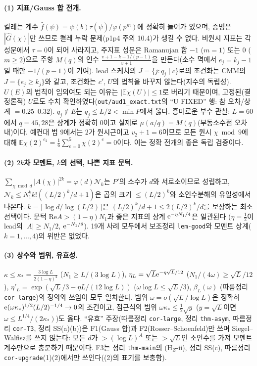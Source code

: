\paragraph{(1) 지표/Gauss 합 전개.}
켤레는 계수 $\hat f(\psi)=\psi(b)\tau(\overline\psi)/\varphi(p^m)$에 정확히 들어가 있으며, 증명은 $|\hat G(\chi)|$만 쓰므로 켤레 누락 문제(p1p4 주의 10.4)가 생길 수 없다.
비원시 지표는 각 성분에서 $\tau=0$이 되어 사라지고, 주지표 성분은 Ramanujan 합 $-1$ ($m=1$) 또는 $0$ ($m\ge2$)으로 주항 $M(q)$의 인수
$\frac{v+1-k-1/(p-1)}{v+1}$을 만든다(소수 멱에서 $e_j=k_j-1$일 때만 $-1/(p-1)$이 기여). lead 스케치의 $J=\{j:q_j\mid c\}$로의 조건화는
CMM의 $J=\{e_j\ge k_j\}$와 같고, 조건화는 $c'$, $U$의 법칙을 바꾸지 않는다(지수의 독립성). $U(E)$의 법칙이 임의여도 되는 이유는 $|\mathbb E\chi(U)|\le1$로 버리기 때문이며,
고정된(결정론적) $U$로도 수치 확인하였다(\texttt{out/aud1\_exact.txt}의 ``U FIXED'' 행: 참 오차/상계 $=0.25$--$0.32$). $q_j\notin E$는 $q_j\le L/2<\min P$에서 옳다.
흥미로운 부수 관찰: $L=60$에서 $q=45,28$은 상계가 정확히 $0$이고 실제로 $\mu(a/q)=M(q)$(부동소수점 오차 내)이다. 예컨대 법 $9$에서는 $2$가 원시근이고 $v_2+1=6$이므로
모든 원시 $\chi\bmod9$에 대해 $\mathbb E\chi(2)^{e_2}=\frac16\sum_{e=0}^5\chi(2)^e=0$이다. 이는 정확 전개의 좋은 독립 검증이다.

\paragraph{(2) $2k$차 모멘트, $k$의 선택, 나쁜 지표 문턱.}
$\sum_{\chi\bmod d}|A(\chi)|^{2k}=\varphi(d)\mathcal N_k$는 $P'$의 소수가 $d$와 서로소이므로 성립하고, $\mathcal N_k\le N_1^kk!((L/2)^k/d+1)$은 곱의 크기 $\le(L/2)^k$와 소인수분해의 유일성에서 나온다.
$k=\lceil\log d/\log(L/2)\rceil$은 $(L/2)^k/d+1\le2(L/2)^k/d$를 보장하는 최소 선택이다. 문턱 $\mathrm{Re}A>(1-\eta)N_1$과 좋은 지표의 상계 $\mathrm{e}^{-\eta N_1/4}$은 일관된다
($\eta=\frac12$이 lead의 $|A|\ge N_1/2$, $\mathrm{e}^{-N_1/8}$). 19개 사례 모두에서 보조정리 \texttt{lem-good}와 모멘트 상계($k=1,\dots,4$)의 위반은 없었다.

\paragraph{(3) 상수와 범위, 유효성.}
$\kappa\le\kappa_*=\frac{3\log L}{2(1-\eta)^2}$ ($N_1\ge L/(3\log L)$), $\eta_L=\sqrt L\mathrm{e}^{-\eta\sqrt L/12}$ ($N_1/(4\omega)\ge\sqrt L/12$), $\eta'_L=\exp(\sqrt L/3-\eta L/(12\log L))$
($\omega\log L\le\sqrt L/3$), $\beta_L(\omega)$ (따름정리 \texttt{cor-large})의 정의와 쓰임이 모두 일치한다. 범위 $\omega=o(\sqrt L/\log L)$은 정확히 $\mathrm{e}(\omega\kappa_*)^{1/2}(L/2)^{-1/4}\to0$의 조건이고,
점근식의 범위 $\omega\kappa_*\le\frac12\sqrt y$ ($y=\sqrt L$이면 $\omega\le L^{1/4}/(2\kappa_*)$)도 옳다. ``유효'' 주장(따름정리 \texttt{cor-large}, 정리 \texttt{thm-asym}, 따름정리 \texttt{cor-T3}, 정리 SS(a)(b))은
F1(Gauss 합)과 F2(Rosser--Schoenfeld)만 쓰며 Siegel--Walfisz를 쓰지 않는다: 모든 $d$가 $>(\log L)^A$ 또는 $>\sqrt L$인 소인수를 가져 모멘트 계수만으로 충분하기 때문이다.
F3는 정리 \texttt{thm-main}의 (H$_Z$-ii), 정리 SS(c), 따름정리 \texttt{cor-upgrade}(1)(2)에서만 쓰인다((2)의 표기를 보충함).

